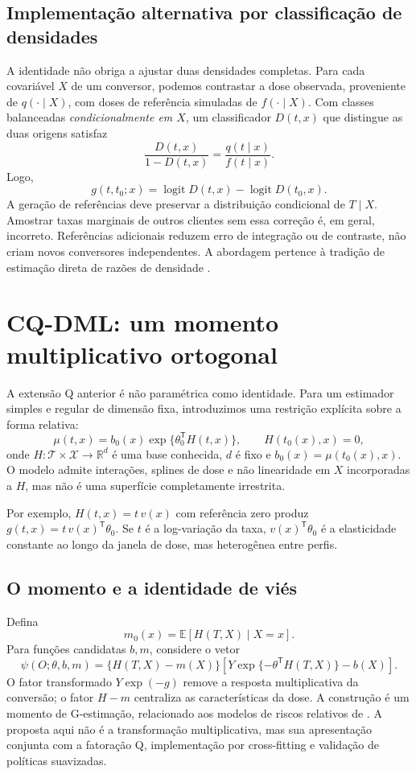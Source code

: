 \documentclass[11pt,a4paper]{article}
\newcommand{\E}{\mathbb E}
\newcommand{\R}{\mathbb R}
\newcommand{\logit}{\operatorname{logit}}
\begin{document}
\subsection{Implementação alternativa por classificação de densidades}
A identidade não obriga a ajustar duas densidades completas. Para cada covariável $X$ de um conversor, podemos contrastar a dose observada, proveniente de $q(\cdot\mid X)$, com doses de referência simuladas de $f(\cdot\mid X)$. Com classes balanceadas \emph{condicionalmente em $X$}, um classificador $D(t,x)$ que distingue as duas origens satisfaz
\[
\frac{D(t,x)}{1-D(t,x)}=\frac{q(t\mid x)}{f(t\mid x)}.
\]
Logo,
\[
g(t,t_0;x)=\logit D(t,x)-\logit D(t_0,x).
\]
A geração de referências deve preservar a distribuição condicional de $T\mid X$. Amostrar taxas marginais de outros clientes sem essa correção é, em geral, incorreto. Referências adicionais reduzem erro de integração ou de contraste, não criam novos conversores independentes. A abordagem pertence à tradição de estimação direta de razões de densidade \cite{sugiyama2012}.

\section{CQ-DML: um momento multiplicativo ortogonal}
\label{sec:dml}
A extensão Q anterior é não paramétrica como identidade. Para um estimador simples e regular de dimensão fixa, introduzimos uma restrição explícita sobre a forma relativa:
\begin{equation}
\mu(t,x)=b_0(x)\exp\{\theta_0^{\mathsf T}H(t,x)\},
\qquad H(t_0(x),x)=0,
\label{eq:structural}
\end{equation}
onde $H:\mathcal T\times\mathcal X\to\R^d$ é uma base conhecida, $d$ é fixo e $b_0(x)=\mu(t_0(x),x)$. O modelo admite interações, splines de dose e não linearidade em $X$ incorporadas a $H$, mas não é uma superfície completamente irrestrita.

Por exemplo, $H(t,x)=t\,v(x)$ com referência zero produz $g(t,x)=t\,v(x)^{\mathsf T}\theta_0$. Se $t$ é a log-variação da taxa, $v(x)^{\mathsf T}\theta_0$ é a elasticidade constante ao longo da janela de dose, mas heterogênea entre perfis.

\subsection{O momento e a identidade de viés}
Defina
\begin{equation}
m_0(x)=\E[H(T,X)\mid X=x].
\label{eq:mH}
\end{equation}
Para funções candidatas $b,m$, considere o vetor
\begin{equation}
\boxed{\psi(O;\theta,b,m)=\{H(T,X)-m(X)\}
   \left[Y\exp\{-\theta^{\mathsf T}H(T,X)\}-b(X)\right].}
\label{eq:psi}
\end{equation}
O fator transformado $Y\exp(-g)$ remove a resposta multiplicativa da conversão; o fator $H-m$ centraliza as características da dose. A construção é um momento de G-estimação, relacionado aos modelos de riscos relativos de \cite{dukes2018,yin2022}. A proposta aqui não é a transformação multiplicativa, mas sua apresentação conjunta com a fatoração Q, implementação por cross-fitting e validação de políticas suavizadas.
\end{document}
